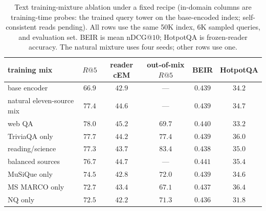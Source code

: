 \begin{table}[H]
\centering\scriptsize
\setlength{\tabcolsep}{3.4pt}
\caption{Text training-mixture ablation under a fixed recipe (in-domain columns are training-time probes: the trained query
tower on the base-encoded index; self-consistent reads pending). All rows use the same 50K index, $6$K sampled queries, and
evaluation set. BEIR is mean nDCG@$10$; HotpotQA is frozen-reader accuracy.
The natural mixture uses four seeds; other rows use one.}
\label{tab:rag_datamix}
\begin{tabular}{lccccc}
\toprule
training mix & $R@5$ & reader cEM & out-of-mix $R@5$ & BEIR & HotpotQA \\
\midrule
base encoder & $66.9$ & $42.9$ & --- & $0.439$ & $34.2$ \\
natural eleven-source mix & $77.4$ & $44.6$ & --- & $0.439$ & $34.7$ \\
web QA & $78.0$ & $45.2$ & $69.7$ & $0.440$ & $33.2$ \\
TriviaQA only & $77.7$ & $44.2$ & $77.4$ & $0.439$ & $36.0$ \\
reading/science & $77.3$ & $43.7$ & $83.4$ & $0.438$ & $35.0$ \\
balanced sources & $76.7$ & $44.7$ & --- & $0.441$ & $35.4$ \\
MuSiQue only & $74.5$ & $42.8$ & $72.0$ & $0.439$ & $34.6$ \\
MS MARCO only & $72.7$ & $43.4$ & $67.1$ & $0.437$ & $36.4$ \\
NQ only & $72.5$ & $42.2$ & $71.3$ & $0.436$ & $31.8$ \\
\bottomrule
\end{tabular}
\end{table}
